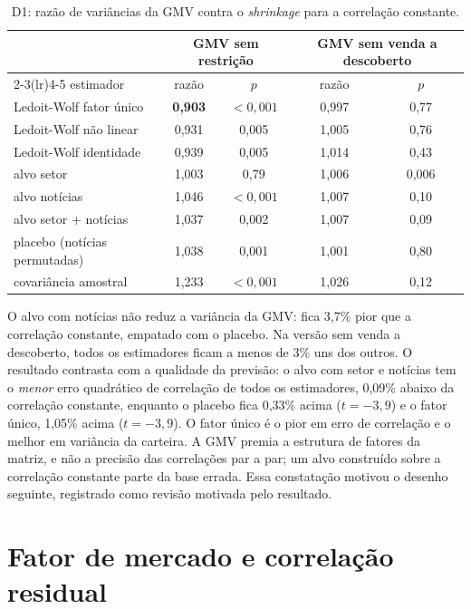 \begin{table}[htbp]
\centering
\small
\caption{D1: razão de variâncias da GMV contra o \emph{shrinkage} para a correlação constante.}
\label{tab:d1}
\begin{tabular}{lcccc}
\toprule
& \multicolumn{2}{c}{GMV sem restrição} & \multicolumn{2}{c}{GMV sem venda a descoberto} \\
\cmidrule(lr){2-3}\cmidrule(lr){4-5}
estimador & razão & $p$ & razão & $p$ \\
\midrule
Ledoit-Wolf fator único & \textbf{0,903} & $<0{,}001$ & 0,997 & 0,77 \\
Ledoit-Wolf não linear & 0,931 & 0,005 & 1,005 & 0,76 \\
Ledoit-Wolf identidade & 0,939 & 0,005 & 1,014 & 0,43 \\
alvo setor & 1,003 & 0,79 & 1,006 & 0,006 \\
alvo notícias & 1,046 & $<0{,}001$ & 1,007 & 0,10 \\
alvo setor + notícias & 1,037 & 0,002 & 1,007 & 0,09 \\
placebo (notícias permutadas) & 1,038 & 0,001 & 1,001 & 0,80 \\
covariância amostral & 1,233 & $<0{,}001$ & 1,026 & 0,12 \\
\bottomrule
\end{tabular}
\end{table}

O alvo com notícias não reduz a variância da GMV: fica 3,7\% pior que a correlação constante, empatado com o
placebo. Na versão sem venda a descoberto, todos os estimadores ficam a menos de 3\% uns dos outros. O
resultado contrasta com a qualidade da previsão: o alvo com setor e notícias tem o \emph{menor} erro
quadrático de correlação de todos os estimadores, 0,09\% abaixo da correlação constante, enquanto o placebo
fica 0,33\% acima ($t=-3{,}9$) e o fator único, 1,05\% acima ($t=-3{,}9$). O fator único é o pior em erro de
correlação e o melhor em variância da carteira. A GMV premia a estrutura de fatores da matriz, e não a
precisão das correlações par a par; um alvo construído sobre a correlação constante parte da base errada.
Essa constatação motivou o desenho seguinte, registrado como revisão motivada pelo resultado.

\section{Fator de mercado e correlação residual}
\label{sec:d2}

